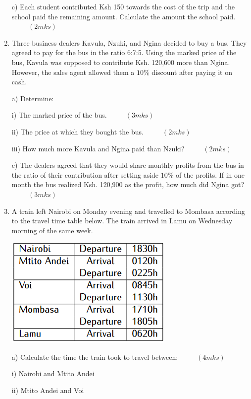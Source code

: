 \documentclass[
  a4paperpaper,
]{scrbook}
\begin{document}
\begin{tcolorbox}
\begin{enumerate}
  c) Each student contributed Ksh 150 towards the cost of the trip and
  the school paid the remaining amount. Calculate the amount the school
  paid. \(\hspace{1cm}(2mks)\)
\item
  Three business dealers Kavula, Nzuki, and Ngina decided to buy a bus.
  They agreed to pay for the bus in the ratio 6:7:5. Using the marked
  price of the bus, Kavula was supposed to contribute Ksh. 120,600 more
  than Ngina. However, the sales agent allowed them a \(10\%\) discount
  after paying it on cash.

  a) Determine:

  i) The marked price of the bus. \(\hspace{1cm} (3mks)\)

  ii) The price at which they bought the bus. \(\hspace{1cm} (2mks)\)

  iii) How much more Kavula and Ngina paid than Nzuki?
  \(\hspace{1cm} (2mks)\)

  c) The dealers agreed that they would share monthly profits from the
  bus in the ratio of their contribution after setting aside \(10\%\) of
  the profits. If in one month the bus realized Ksh. 120,900 as the
  profit, how much did Ngina got? \(\hspace{1cm} (3mks)\)
\item
  A train left Nairobi on Monday evening and travelled to Mombasa
  according to the travel time table below. The train arrived in Lamu on
  Wednesday morning of the same week.

  \includegraphics{figures/Md4_Q18.png}

  a) Calculate the time the train took to travel between:
  \(\hspace{1cm} (4mks)\)

  i) Nairobi and Mtito Andei

  ii) Mtito Andei and Voi


\end{enumerate}
\end{tcolorbox}
\end{document}

